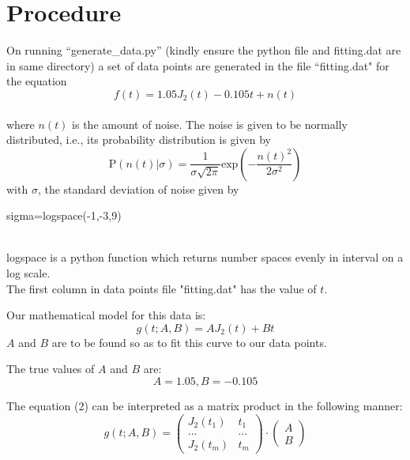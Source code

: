\documentclass[12pt, a4paper]{report}
\begin{document}
\section*{Procedure}
\begin{description}[font=$\bullet$]
\item On running ``generate\_data.py'' (kindly ensure the python file and fitting.dat are in same directory) a set of data points are generated in the file ``fitting.dat" for the equation 
\begin{equation}\label{eq:1}
f(t)=1.05J_{2}(t)-0.105t+n(t)
 \end{equation}
\\
where $n(t)$ is the amount of noise.  The noise is given to be normally distributed, i.e., its probability distribution is given by
 \begin{equation*}
\mathrm{P}(n(t)|\sigma)=\frac{1}{\sigma\sqrt{2\pi}}\text{exp}\left(-\frac{n(t)^{2}}{2\sigma^{2}}\right)
 \end{equation*}
with $\sigma$, the standard deviation of noise given by
\begin{psudo}
sigma=logspace(-1,-3,9)
\end{psudo}
\\
logspace is a python function which returns number spaces evenly in interval on a log scale.
\\
The first column in data points file "fitting.dat" has the value of $t$.
\item Our mathematical model for this data is:
\begin{equation}\label{eq:2}
g(t;A,B)=AJ_{2}(t)+Bt
\end{equation}
$A$ and $B$ are to be found so as to fit this curve to our data points.
\item The true values of $A$ and $B$ are:
\begin{equation*}
    A = 1.05, B = -0.105
\end{equation*}
\item The equation (2) can be interpreted as a matrix product in the following manner:
\begin{equation}
g(t;A,B)=
    \begin{pmatrix}
J_{2}(t_{1}) & t_{1}\\
... & ... \\
J_{2}(t_{m}) & t_{m}
\end{pmatrix}
\cdot
\begin{pmatrix}
A\\B
\end{pmatrix}

\end{equation}
\end{description}
\end{document}
